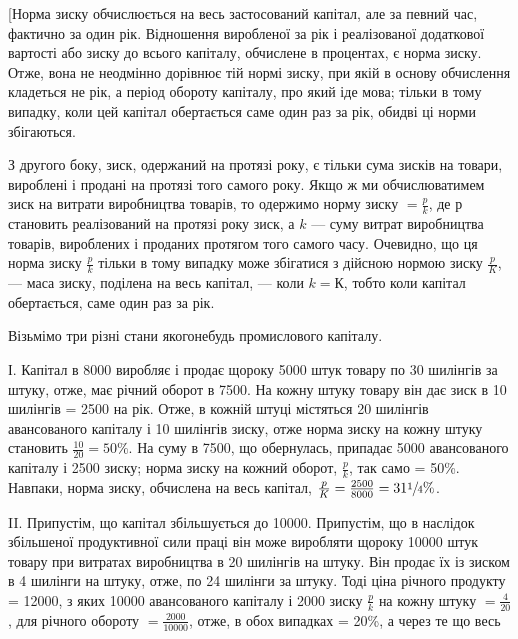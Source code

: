 
[Норма зиску обчислюється на весь застосований капітал, але за певний час, фактично за один рік.
Відношення виробленої за рік і реалізованої додаткової вартості або зиску до всього капіталу,
обчислене в процентах, є норма зиску. Отже, вона не неодмінно дорівнює тій нормі зиску, при якій в
основу обчислення кладеться не рік, а період обороту капіталу, про який іде мова; тільки в тому
випадку, коли цей капітал обертається саме один раз за рік, обидві ці норми збігаються.

З другого боку, зиск, одержаний на протязі року, є тільки сума зисків на товари, вироблені і продані
на протязі того самого року. Якщо ж ми обчислюватимем зиск на витрати виробництва товарів, то
одержимо норму зиску $= \frac{p}{k}$, де $р$ становить реалізований на протязі року зиск, а $k$ — суму витрат
виробництва товарів, вироблених і проданих протягом того самого часу. Очевидно, що ця норма зиску
$\frac{p}{k}$ тільки в тому випадку може збігатися з дійсною нормою зиску $\frac{p}{K}$, — маса зиску, поділена на весь
капітал, — коли $k = К$, тобто коли капітал обертається, саме один раз за рік.

Візьмімо три різні стани якогонебудь промислового капіталу.

І. Капітал в 8000 виробляє і продає щороку 5000 штук товару по 30 шилінгів за
штуку, отже, має річний оборот в 7500. На кожну штуку товару
він дає зиск в 10 шилінгів = 2500 на рік. Отже, в кожній штуці містяться 20
шилінгів авансованого капіталу і 10 шилінгів зиску, отже норма зиску на кожну штуку становить
$\frac{10}{20}= 50\%$. На суму в 7500, що обернулась, припадає 5000
авансованого капіталу і 2500 зиску; норма зиску на кожний оборот, $\frac{p}{k}$, так само =
50\%. Навпаки, норма зиску, обчислена на весь капітал, $\frac{p}{K} = \frac{2500}{8000} = 31\sfrac{1}{4}\%$.

II. Припустім, що капітал збільшується до \num{10000}. Припустім, що в наслідок
збільшеної продуктивної сили праці він може виробляти щороку \num{10000} штук товару при витратах
виробництва в 20 шилінгів на штуку. Він продає їх із зиском в 4 шилінги на штуку, отже, по 24
шилінги за штуку. Тоді ціна річного продукту = \num{12000}, з яких \num{10000} авансованого капіталу і 2000 зиску $\frac{p}{k}$ на кожну штуку $= \frac{4}{20}$, для річного
обороту $= \frac{2000}{\num{10000}}$, отже, в обох випадках = 20\%, а через те що весь
\parbreak{}  %
